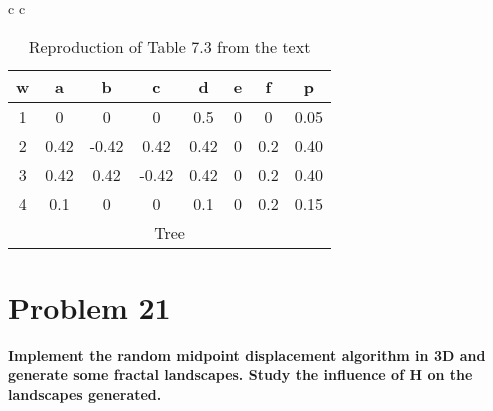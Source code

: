\begin{table}
\begin{tabular}{ c c }
	\begin{tabular}{ c c c c c c c c }
	\hline
	w & a & b & c & d & e & f & p \\
	\hline
	1 & 0 & 0 & 0 & 0.5 & 0 & 0 & 0.05 \\
	2 & 0.42 & -0.42 & 0.42 & 0.42 & 0 & 0.2 & 0.40 \\
	3 & 0.42 & 0.42 & -0.42 & 0.42 & 0 & 0.2 & 0.40 \\
	4 & 0.1 & 0 & 0 & 0.1 & 0 & 0.2 & 0.15 \\
	\hline
	\multicolumn{8}{c}{Tree}
	\end{tabular}
\end{tabular}
\caption{Reproduction of Table 7.3 from the text}
\end{table}

\section{Problem 21}
\textbf{
Implement the random midpoint displacement algorithm in 3D and generate some fractal landscapes. Study the influence of H on the landscapes generated.
}

\hfill \\
